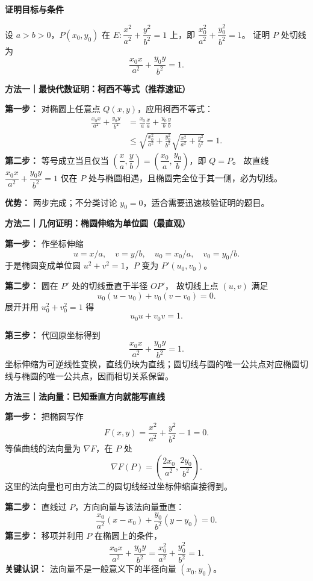 \begin{proofbox}
\textbf{\textcolor{CProof}{证明目标与条件}}

设 $a>b>0$，$P(x_0,y_0)$ 在
$E:\dfrac{x^2}{a^2}+\dfrac{y^2}{b^2}=1$ 上，即
$\dfrac{x_0^2}{a^2}+\dfrac{y_0^2}{b^2}=1$。
证明 $P$ 处切线为
\[
\boxed{\frac{x_0x}{a^2}+\frac{y_0y}{b^2}=1.}
\]

\medskip
\textbf{\textcolor{CProof}{方法一｜最快代数证明：柯西不等式（推荐速证）}}

\textbf{第一步：} 对椭圆上任意点 $Q(x,y)$，应用柯西不等式：
\[
\begin{aligned}
\frac{x_0x}{a^2}+\frac{y_0y}{b^2}
&=\frac{x_0}{a}\frac{x}{a}+\frac{y_0}{b}\frac{y}{b}\\
&\le\sqrt{\frac{x_0^2}{a^2}+\frac{y_0^2}{b^2}}
\sqrt{\frac{x^2}{a^2}+\frac{y^2}{b^2}}=1.
\end{aligned}
\]
\textbf{第二步：} 等号成立当且仅当
$\left(\dfrac{x}{a},\dfrac{y}{b}\right)
=\left(\dfrac{x_0}{a},\dfrac{y_0}{b}\right)$，即 $Q=P$。
故直线 $\dfrac{x_0x}{a^2}+\dfrac{y_0y}{b^2}=1$
仅在 $P$ 处与椭圆相遇，且椭圆完全位于其一侧，必为切线。

\textbf{优势：} 两步完成；不分类讨论 $y_0=0$，适合需要迅速核验证明的题目。

\medskip
\textbf{\textcolor{CProof}{方法二｜几何证明：椭圆伸缩为单位圆（最直观）}}

\textbf{第一步：} 作坐标伸缩
\[
 u=x/a,\quad v=y/b,\quad u_0=x_0/a,\quad v_0=y_0/b.
\]
于是椭圆变成单位圆 $u^2+v^2=1$，$P$ 变为 $P'(u_0,v_0)$。

\textbf{第二步：} 圆在 $P'$ 处的切线垂直于半径 $OP'$，
故切线上点 $(u,v)$ 满足
\[
 u_0(u-u_0)+v_0(v-v_0)=0.
\]
展开并用 $u_0^2+v_0^2=1$ 得
\[
 u_0u+v_0v=1.
\]

\textbf{第三步：} 代回原坐标得到
\[
 \frac{x_0x}{a^2}+\frac{y_0y}{b^2}=1.
\]
坐标伸缩为可逆线性变换，直线仍映为直线；圆切线与圆的唯一公共点对应椭圆切线与椭圆的唯一公共点，因而相切关系保留。

\medskip
\textbf{\textcolor{CProof}{方法三｜法向量：已知垂直方向就能写直线}}

\textbf{第一步：} 把椭圆写作
\[
F(x,y)=\frac{x^2}{a^2}+\frac{y^2}{b^2}-1=0.
\]
等值曲线的法向量为 $\nabla F$，在 $P$ 处
\[
 \nabla F(P)=\left(\frac{2x_0}{a^2},\frac{2y_0}{b^2}\right).
\]
这里的法向量也可由方法二的圆切线经过坐标伸缩直接得到。

\textbf{第二步：} 直线过 $P$，方向向量与该法向量垂直：
\[
 \frac{x_0}{a^2}(x-x_0)+\frac{y_0}{b^2}(y-y_0)=0.
\]
\textbf{第三步：} 移项并利用 $P$ 在椭圆上的条件，
\[
 \frac{x_0x}{a^2}+\frac{y_0y}{b^2}
 =\frac{x_0^2}{a^2}+\frac{y_0^2}{b^2}=1.
\]
\textbf{关键认识：} 法向量不是一般意义下的半径向量 $(x_0,y_0)$。


\end{proofbox}
